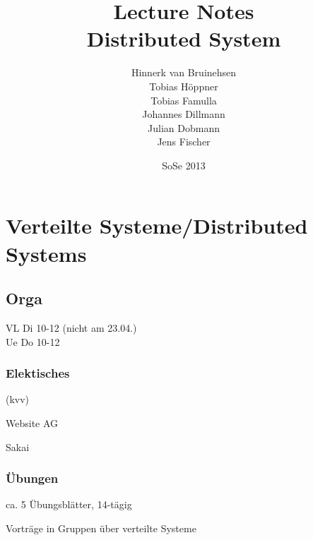 \documentclass[ngerman,a4paper]{report}
\author{Hinnerk van Bruinehsen\\Tobias Höppner\\Tobias Famulla\\Johannes Dillmann\\Julian Dobmann\\Jens Fischer}
\title{Lecture Notes\\\Huge{Distributed System}}
\date{SoSe 2013}
\begin{document}
\maketitle
\tableofcontents

\chapter{Verteilte Systeme/Distributed Systems}
\section{Orga}
VL Di 10-12 (nicht am 23.04.)\\
Ue Do 10-12\\

\subsection{Elektisches}
\begin{compactitem}
\item (kvv)
\item Website AG
\item Sakai
\end{compactitem}

\subsection{Übungen}

\begin{compactitem}
\item ca. 5 Übungsblätter, 14-tägig
\item Vorträge in Gruppen über \glqq verteilte Systeme\grqq
\end{compactitem}
\end{document}
